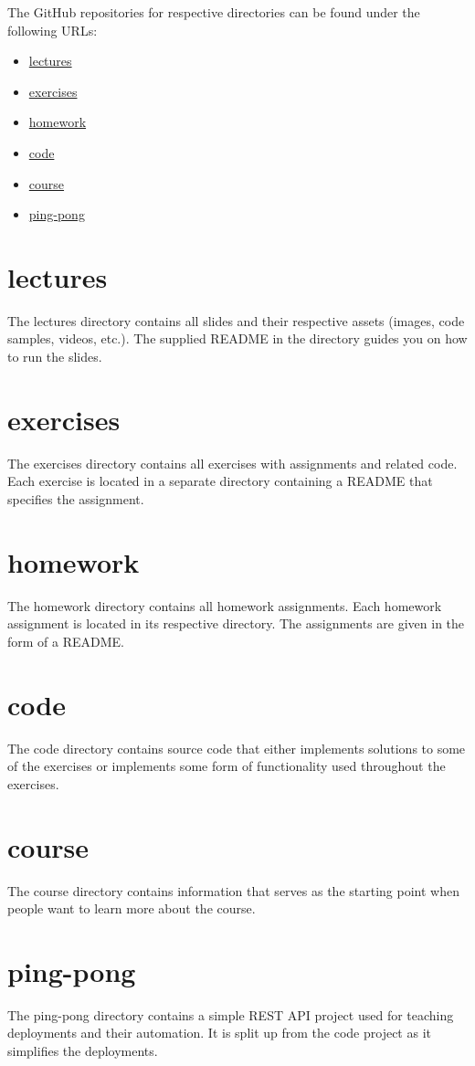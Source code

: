 \documentclass[
  digital,
  color,
  oneside,
  nosansbold,
  nocolorbold,
  lof,
  lot,
]{fithesis4}
\begin{document}
The GitHub repositories for respective directories can be found under the following URLs:
\begin{itemize}
    \item \href{https://github.com/course-go/lectures}{lectures}
    \item \href{https://github.com/course-go/exercises}{exercises}
    \item \href{https://github.com/course-go/homework}{homework}
    \item \href{https://github.com/course-go/code}{code}
    \item \href{https://github.com/course-go/course}{course}
    \item \href{https://github.com/course-go/ping-pong}{ping-pong}
\end{itemize}

\section{lectures}

The lectures directory contains all slides and their respective assets (images, code samples, videos, etc.). The supplied README in the directory guides you on how to run the slides.

\section{exercises}

The exercises directory contains all exercises with assignments and related code. Each exercise is located in a separate directory containing a README that specifies the assignment.

\section{homework}

The homework directory contains all homework assignments. Each homework assignment is located in its respective directory. The assignments are given in the form of a README.

\section{code}

The code directory contains source code that either implements solutions to some of the exercises or implements some form of functionality used throughout the exercises.
\section{course}

The course directory contains information that serves as the starting point when people want to learn more about the course.
\section{ping-pong}

The ping-pong directory contains a simple REST API project used for teaching deployments and their automation. It is split up from the code project as it simplifies the deployments.
\end{document}
